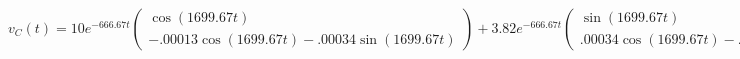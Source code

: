 \documentclass[preview]{standalone}
\begin{document}
\begin{center}
\[
                                 v_C(t) = 10e^{-666.67t}
                                                \begin{pmatrix} 
                                                \cos(1699.67t) \\ 
                                                -.00013\cos(1699.67t) - .00034\sin(1699.67t)
                                                \end{pmatrix}
                                                + 3.82e^{-666.67t}
                                                \begin{pmatrix} 
                                                \sin(1699.67t) \\ 
                                                .00034\cos(1699.67t) - .00013\sin(1699.67t)
                                                \end{pmatrix}
                        \]
\end{center}
\end{document}
